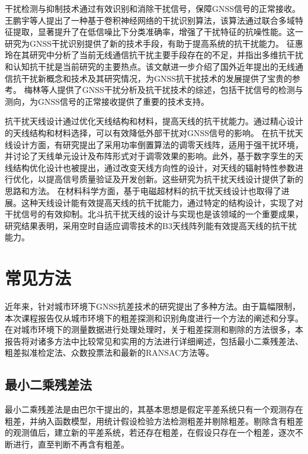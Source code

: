 \documentclass[12pt,hyperref,a4paper,UTF8]{ctexart}
\begin{document}
干扰检测与抑制技术通过有效识别和消除干扰信号，保障GNSS信号的正常接收。王鹏宇等人提出了一种基于卷积神经网络的干扰识别算法，该算法通过联合多域特征提取，显著提升了在低信噪比下分类准确率，增强了干扰特征的抗噪性能\cite{wang2023interference}。这一研究为GNSS干扰识别提供了新的技术手段，有助于提高系统的抗干扰能力。
征惠玲在其研究中分析了当前无线通信抗干扰主要手段存在的不足，并指出多维抗干扰和认知抗干扰是当前研究的主要热点\cite{zheng2023wireless}。该文献进一步介绍了国外近年提出的无线通信抗干扰新概念和技术及其研究情况，为GNSS抗干扰技术的发展提供了宝贵的参考。
梅林等人提供了GNSS干扰分析及抗干扰技术的综述，包括干扰信号的检测与测向，为GNSS信号的正常接收提供了重要的技术支持\cite{梅林2021GNSS}。

抗干扰天线设计通过优化天线结构和材料，提高天线的抗干扰能力。通过精心设计的天线结构和材料选择，可以有效降低外部干扰对GNSS信号的影响。
在抗干扰天线设计方面，有研究提出了采用功率倒置算法的调零天线阵，适用于强干扰环境，并讨论了天线单元设计及布阵形式对于调零效果的影响\cite{147}。此外，基于数字孪生的天线结构优化设计也被提出，通过改变天线方向性的设计，对天线的辐射特性参数进行优化，以提高信号质量验证及开发创新\cite{148}。这些研究为抗干扰天线设计提供了新的思路和方法。
在材料科学方面，基于电磁超材料的抗干扰天线设计也取得了进展。这种天线设计能有效提高天线的抗干扰能力，通过特定的结构设计，实现了对干扰信号的有效抑制\cite{150}。北斗抗干扰天线的设计与实现也是该领域的一个重要成果，研究结果表明，采用空时自适应调零技术的B3天线阵列能有效提高天线的抗干扰能力\cite{154}。

\section{常见方法}
近年来，针对城市环境下GNSS抗差技术的研究提出了多种方法。由于篇幅限制，本次课程报告仅从城市环境下的粗差探测和识别角度进行一个方法的阐述和分享。
在对城市环境下的测量数据进行处理处理时，关于粗差探测和剔除的方法很多，本报告将对诸多方法中比较常见和实用的方法进行详细阐述，包括最小二乘残差法、粗差拟准检定法、众数投票法和最新的RANSAC方法等。
\subsection{最小二乘残差法}
最小二乘残差法是由巴尔干提出的，其基本思想是假定平差系统只有一个观测存在粗差，并纳入函数模型，用统计假设检验方法检测粗差并剔除粗差。剔除含有粗差的观测值后，建立新的平差系统，若还存在粗差，在假设只存在一个粗差，逐次不断进行，直至判断不再含有粗差。
\end{document}
